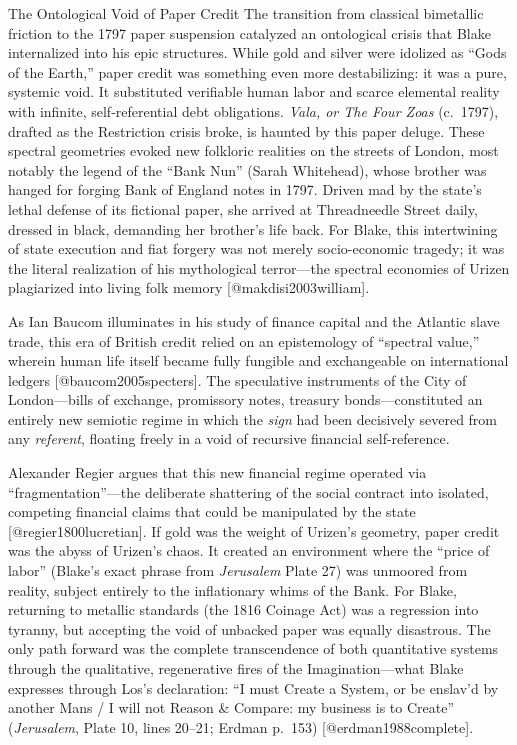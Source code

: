 \documentclass[
  ignorenonframetext,
]{beamer}
\begin{document}
\begin{frame}{The Ontological Void of Paper Credit}
\protect{}\label{the-ontological-void-of-paper-credit}
The transition from classical bimetallic friction to the 1797 paper
suspension catalyzed an ontological crisis that Blake internalized into
his epic structures. While gold and silver were idolized as ``Gods of
the Earth,'' paper credit was something even more destabilizing: it was
a pure, systemic void. It substituted verifiable human labor and scarce
elemental reality with infinite, self-referential debt obligations.
\emph{Vala, or The Four Zoas} (c.~1797), drafted as the Restriction
crisis broke, is haunted by this paper deluge. These spectral geometries
evoked new folkloric realities on the streets of London, most notably
the legend of the ``Bank Nun'' (Sarah Whitehead), whose brother was
hanged for forging Bank of England notes in 1797. Driven mad by the
state's lethal defense of its fictional paper, she arrived at
Threadneedle Street daily, dressed in black, demanding her brother's
life back. For Blake, this intertwining of state execution and fiat
forgery was not merely socio-economic tragedy; it was the literal
realization of his mythological terror---the spectral economies of
Urizen plagiarized into living folk memory {[}@makdisi2003william{]}.

As Ian Baucom illuminates in his study of finance capital and the
Atlantic slave trade, this era of British credit relied on an
epistemology of ``spectral value,'' wherein human life itself became
fully fungible and exchangeable on international ledgers
{[}@baucom2005specters{]}. The speculative instruments of the City of
London---bills of exchange, promissory notes, treasury
bonds---constituted an entirely new semiotic regime in which the
\emph{sign} had been decisively severed from any \emph{referent},
floating freely in a void of recursive financial self-reference.

Alexander Regier argues that this new financial regime operated via
``fragmentation''---the deliberate shattering of the social contract
into isolated, competing financial claims that could be manipulated by
the state {[}@regier1800lucretian{]}. If gold was the weight of Urizen's
geometry, paper credit was the abyss of Urizen's chaos. It created an
environment where the ``price of labor'' (Blake's exact phrase from
\emph{Jerusalem} Plate 27) was unmoored from reality, subject entirely
to the inflationary whims of the Bank. For Blake, returning to metallic
standards (the 1816 Coinage Act) was a regression into tyranny, but
accepting the void of unbacked paper was equally disastrous. The only
path forward was the complete transcendence of both quantitative systems
through the qualitative, regenerative fires of the Imagination---what
Blake expresses through Los's declaration: ``I must Create a System, or
be enslav'd by another Mans / I will not Reason \& Compare: my business
is to Create'' (\emph{Jerusalem}, Plate 10, lines 20--21; Erdman p.~153)
{[}@erdman1988complete{]}.
\end{frame}
\end{document}
